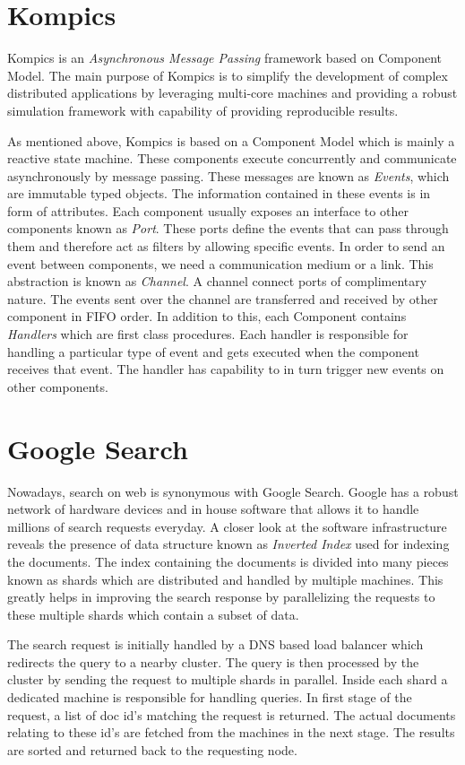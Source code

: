 \documentclass[12pt,a4paper,twoside,openright]{book}
\begin{document}
\section{Kompics}
Kompics \cite{kompics} is an \textit{Asynchronous Message Passing} framework based on Component Model. The main purpose of Kompics is to simplify the development of complex distributed applications by leveraging multi-core machines and providing a robust simulation framework with capability of providing reproducible results. 
\par As mentioned above, Kompics is based on a Component Model which is mainly a reactive state machine. These components execute concurrently and communicate asynchronously by message passing. These messages are known as \textit{Events}, which are immutable typed objects. The information contained in these events is in form of attributes. Each component usually exposes an interface to other components known as \textit{Port}. These ports define the events that can pass through them and therefore act as filters by allowing specific events. In order to send an event between components, we need a communication medium or a link. This abstraction is known as \textit{Channel}. A channel connect ports of complimentary nature. The events sent over the channel are transferred and received by other component in FIFO order. In addition to this, each Component contains \textit{Handlers} which are first class procedures. Each handler is responsible for handling a particular type of event and gets executed when the component receives that event. The handler has capability to in turn trigger new events on other components. 


\section{Google Search}
Nowadays, search on web is synonymous with Google Search. Google has a robust network of hardware devices and in house software that allows it to handle millions of search requests everyday. A closer look at the software infrastructure \cite{googleArchitecture} reveals the presence of data structure known as \textit{Inverted Index} used for indexing the documents. The index containing the documents is divided into many pieces known as shards which are distributed and handled by multiple machines. This greatly helps in improving the search response by parallelizing the requests to these multiple shards which contain a subset of data. 
\par The search request is initially handled by a DNS based load balancer which redirects the query to a nearby cluster. The query is then processed by the cluster by sending the request to multiple shards in parallel. Inside each shard a dedicated machine is responsible for handling queries. In first stage of the request, a list of doc id's matching the request is returned. The actual documents relating to these id's are fetched from the machines in the next stage. The results are sorted and returned back to the requesting node.
\end{document}
